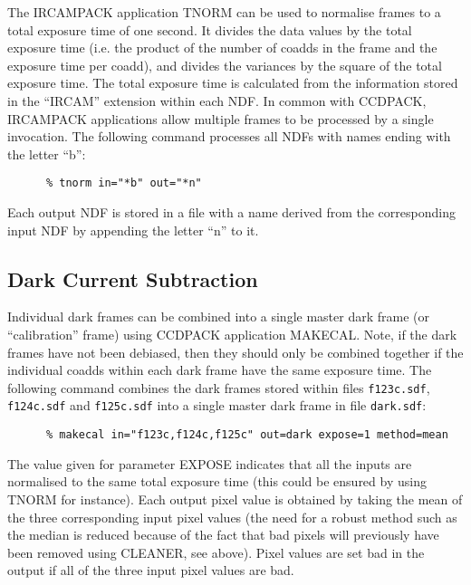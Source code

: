 The {\small IRCAMPACK} application {\small TNORM} can be used to
normalise frames to a total exposure time of one second. It divides the
data values by the total exposure time (i.e. the product of the number
of coadds in the frame and the exposure time per coadd), and divides
the variances by the square of the total exposure time. The total
exposure time is calculated from the information stored in the
``{\small IRCAM}'' extension within each {\small NDF}. In common with
{\small CCDPACK, IRCAMPACK} applications allow multiple frames to be
processed by a single invocation. The following command processes all
{\small NDF}s with names ending with the letter ``b'':

\small
\begin{verbatim}
      % tnorm in="*b" out="*n"
\end{verbatim}
\normalsize

Each output {\small NDF} is stored in a file with a name derived from
the corresponding input {\small NDF} by appending the letter ``n'' to
it.

\subsection{Dark Current Subtraction}

Individual dark frames can be combined into a single master dark frame
(or ``calibration'' frame) using {\small CCDPACK} application {\small
MAKECAL}.  Note, if the dark frames have not been debiased, then they
should only be combined together if the individual coadds within each
dark frame have the same exposure time. The following command combines
the dark frames stored within files \verb+f123c.sdf+, \verb+f124c.sdf+
and \verb+f125c.sdf+ into a single master dark frame in file
\verb+dark.sdf+:

\small
\begin{verbatim}
      % makecal in="f123c,f124c,f125c" out=dark expose=1 method=mean
\end{verbatim}
\normalsize

The value given for parameter {\small EXPOSE} indicates that all the
inputs are normalised to the same total exposure time (this could be
ensured by using {\small TNORM} for instance). Each output pixel value
is obtained by taking the mean of the three corresponding input pixel
values (the need for a robust method such as the median is reduced
because of the fact that bad pixels will previously have been removed
using {\small CLEANER}, see above). Pixel values are set bad in the
output if all of the three input pixel values are bad.

